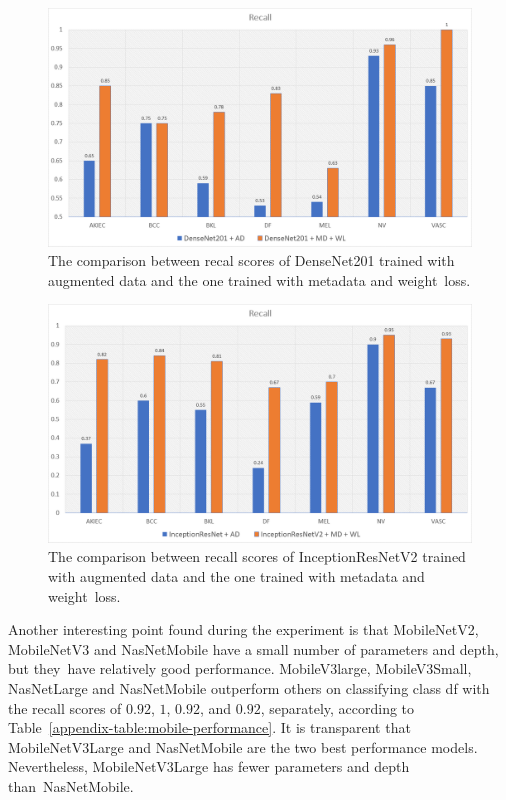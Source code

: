 \documentclass[sensors,article,accept,pdftex,moreauthors]{Definitions/mdpi}
\begin{document}
\begin{figure}[H]
	\centering
	\includegraphics[width=1\linewidth]{Definitions/den re}
	\caption{The comparison between recal scores of DenseNet201 trained with augmented data and the one trained with metadata and weight~loss.}
	\label{fig:den recall}
\end{figure}
\unskip

\begin{figure}[H]
	\centering
	\includegraphics[width=1\linewidth]{Definitions/in re}
	\caption{The comparison between recall scores of InceptionResNetV2 trained with augmented data and the one trained with metadata and weight~loss.}
	\label{fig:incep recall}
\end{figure}

Another interesting point found during the experiment is that MobileNetV2, MobileNetV3 and NasNetMobile have a small number of parameters and depth, but they~have relatively good performance. MobileV3large, MobileV3Small, NasNetLarge and NasNetMobile outperform others on classifying class df with the recall scores of $0.92$, $1$, $0.92$, and $0.92$, separately, according to Table~\ref{appendix-table:mobile-performance}. It is transparent that MobileNetV3Large and NasNetMobile are the two best performance models. Nevertheless, MobileNetV3Large has fewer parameters and depth than~NasNetMobile.
\end{document}
